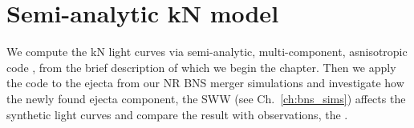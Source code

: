 %
%
%











\section{Semi-analytic \ac{kN} model}\label{sec:kilonova:albino}

We compute the \ac{kN} light curves via 
semi-analytic, multi-component, asnisotropic code \mkn{} 
\citep{Perego:2017wtu,Barbieri:2019sjc,Breschi:2021wzr},
from the brief description of which we begin the chapter.
%
Then we apply the code \mkn{} to the ejecta from our \ac{NR} \ac{BNS} 
merger simulations and investigate how the newly found ejecta component, the 
\ac{SWW} (see Ch.~\ref{ch:bns_sims}) affects the synthetic light curves and 
compare the result with observations, the \AT{}.



